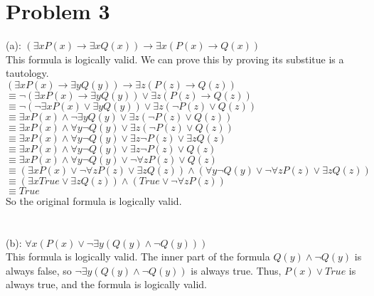 \documentclass{article}
\begin{document}
\section{Problem 3}
(a): $(\exists x P(x) \rightarrow \exists x Q(x)) \rightarrow \exists x (P(x) \rightarrow Q(x))$\\
This formula is logically valid. We can prove this by proving its substitue is a tautology.\\
$(\exists x P(x) \rightarrow \exists y Q(y)) \rightarrow \exists z (P(z) \rightarrow Q(z))$\\
$\equiv \neg (\exists x P(x) \rightarrow \exists y Q(y)) \vee \exists z (P(z) \rightarrow Q(z))$\\
$\equiv \neg (\neg \exists x P(x) \vee \exists y Q(y)) \vee \exists z (\neg P(z) \vee Q(z))$\\
$\equiv \exists x P(x) \wedge \neg \exists y Q(y) \vee \exists z (\neg P(z) \vee Q(z))$\\
$\equiv \exists x P(x) \wedge \forall y \neg Q(y) \vee \exists z (\neg P(z) \vee Q(z))$\\
$\equiv \exists x P(x) \wedge \forall y \neg Q(y) \vee \exists z \neg P(z) \vee \exists z Q(z)$\\
$\equiv \exists x P(x) \wedge \forall y \neg Q(y) \vee \exists z \neg P(z) \vee Q(z)$\\
$\equiv \exists x P(x) \wedge \forall y \neg Q(y) \vee \neg \forall z P(z) \vee Q(z)$\\
$\equiv (\exists x P(x) \vee \neg \forall z P(z) \vee \exists z Q(z)) \wedge (\forall y \neg Q(y) \vee \neg \forall z P(z) \vee \exists z Q(z))$\\
$\equiv (\exists x True \vee \exists z Q(z)) \wedge (True \vee \neg \forall z P(z))$\\
$\equiv True$\\
So the original formula is logically valid.\\
\\ \hspace*{\fill} \\
(b): $\forall x (P(x) \vee \neg \exists y (Q(y) \wedge \neg Q(y)))$\\
This formula is logically valid. The inner part of the formula $Q(y) \wedge \neg Q(y)$ is always false, so $\neg \exists y (Q(y) \wedge \neg Q(y))$ is always true. Thus, $P(x) \vee True$ is always true, and the formula is logically valid.\\
\\ \hspace*{\fill} \\
\end{document}
